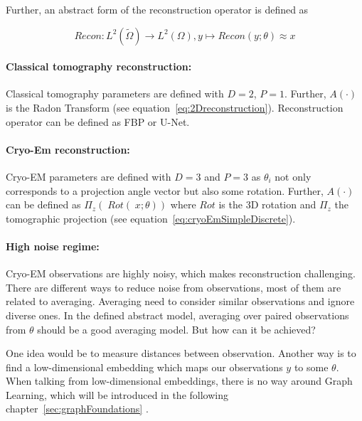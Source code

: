 Further, an abstract form of the reconstruction operator is defined as 

\begin{equation}
    Recon : L^2(\tilde{\Omega}) \to L^2(\Omega), y \mapsto Recon(y; \theta) \approx x
\end{equation}


\paragraph{Classical tomography reconstruction:}

Classical tomography parameters are defined with $D=2$, $P=1$.
Further, $A(\cdot)$ is the Radon Transform (see equation~\ref{eq:2Dreconstruction}).
Reconstruction operator can be defined as FBP or U-Net\cite{unet-tomography}.

\paragraph{Cryo-Em reconstruction:}
Cryo-EM parameters are defined with $D=3$ and $P=3$ as $\theta_i$ not only corresponds to
a projection angle vector but also some rotation.
Further, $A(\cdot)$ can be defined as $\Pi_z \left(\; Rot(\;x; \theta) \right)$ 
where $Rot$ is the 3D rotation and $\Pi_z$ the tomographic projection (see equation~\ref{eq:cryoEmSimpleDiscrete}).

\paragraph{High noise regime:}
Cryo-EM observations are highly noisy, which makes reconstruction challenging. 
There are different ways to reduce noise from observations, most of them are related to averaging. 
Averaging need to consider similar observations and ignore diverse ones. 
In the defined abstract model, averaging over paired observations from $\theta$ should be a good averaging model.
But how can it be achieved? 

One idea would be to measure distances between observation.
Another way is to find a low-dimensional embedding which maps our observations $y$ to some $\theta$.
When talking from low-dimensional embeddings, there is no way around Graph Learning, which will be introduced
in the following chapter~\ref{sec:graphFoundations} \textit{}.

